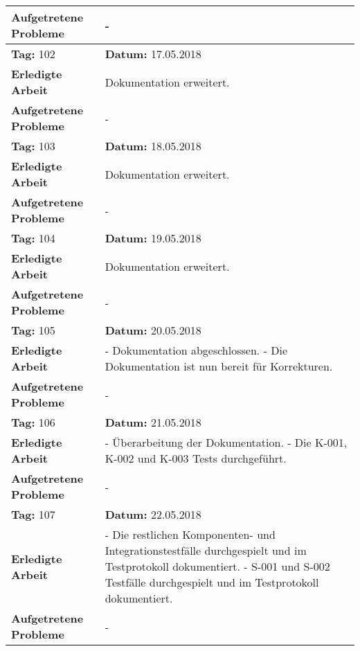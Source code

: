 \begin{longtable}{|p{5cm}|p{5cm}p{6cm}|}
\textbf{Aufgetretene Probleme} & \multicolumn{2}{p{11cm}|}{-} \\ \hline
\rowcolor{heading}\textbf{Tag:} 102 & \textbf{Datum:} 17.05.2018 & \\ \hline
\textbf{Erledigte Arbeit} & \multicolumn{2}{p{11cm}|}{Dokumentation erweitert.} \\ \hline
\textbf{Aufgetretene Probleme} & \multicolumn{2}{p{11cm}|}{-} \\ \hline
\rowcolor{heading}\textbf{Tag:} 103 & \textbf{Datum:} 18.05.2018 & \\ \hline
\textbf{Erledigte Arbeit} & \multicolumn{2}{p{11cm}|}{Dokumentation erweitert.} \\ \hline
\textbf{Aufgetretene Probleme} & \multicolumn{2}{p{11cm}|}{-} \\ \hline
\rowcolor{heading}\textbf{Tag:} 104 & \textbf{Datum:} 19.05.2018 & \\ \hline
\textbf{Erledigte Arbeit} & \multicolumn{2}{p{11cm}|}{Dokumentation erweitert.} \\ \hline
\textbf{Aufgetretene Probleme} & \multicolumn{2}{p{11cm}|}{-} \\ \hline
\rowcolor{heading}\textbf{Tag:} 105 & \textbf{Datum:} 20.05.2018 & \\ \hline
\textbf{Erledigte Arbeit} & \multicolumn{2}{p{11cm}|}{- Dokumentation abgeschlossen. \newline
- Die Dokumentation ist nun bereit für Korrekturen.} \\ \hline
\textbf{Aufgetretene Probleme} & \multicolumn{2}{p{11cm}|}{-} \\ \hline
\rowcolor{heading}\textbf{Tag:} 106 & \textbf{Datum:} 21.05.2018 & \\ \hline
\textbf{Erledigte Arbeit} & \multicolumn{2}{p{11cm}|}{- Überarbeitung der Dokumentation. \newline
- Die K-001, K-002 und K-003 Tests durchgeführt. } \\ \hline
\textbf{Aufgetretene Probleme} & \multicolumn{2}{p{11cm}|}{-} \\ \hline
\rowcolor{heading}\textbf{Tag:} 107 & \textbf{Datum:} 22.05.2018 & \\ \hline
\textbf{Erledigte Arbeit} & \multicolumn{2}{p{11cm}|}{- Die restlichen Komponenten- und Integrationstestfälle durchgespielt und im Testprotokoll dokumentiert.\newline 
- S-001 und S-002 Testfälle durchgespielt und im Testprotokoll dokumentiert.} \\ \hline
\textbf{Aufgetretene Probleme} & \multicolumn{2}{p{11cm}|}{-} \\ \hline

\end{longtable}
